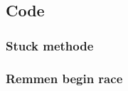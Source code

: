 \documentclass{article}
\begin{document}
\subsection{Code}
\subsubsection*{Stuck methode}
\label{stuckmethode}

\pagebreak
\subsubsection*{Remmen begin race}
\label{breaks}

\newpage

\newpage

%

\end{document}
